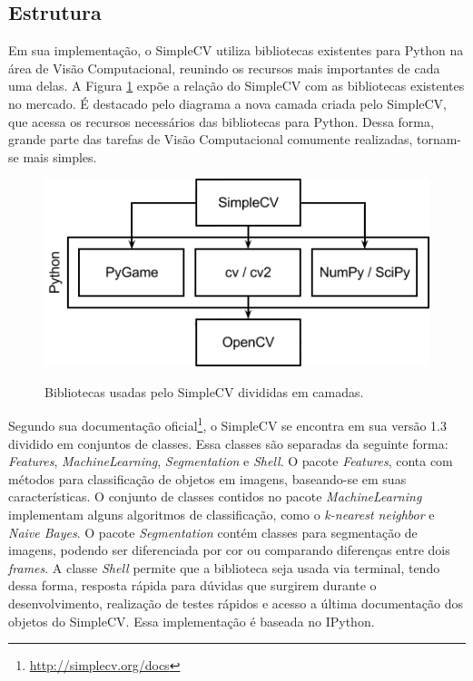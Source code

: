 \subsection{Estrutura}

Em sua implementação, o SimpleCV utiliza bibliotecas existentes para Python na área de Visão Computacional, reunindo os recursos mais importantes de cada uma delas. A Figura \ref{img:estrutura_simplecv} expõe a relação do SimpleCV com as bibliotecas existentes no mercado. É destacado pelo diagrama a nova camada criada pelo SimpleCV, que acessa os recursos necessários das bibliotecas para Python. Dessa forma, grande parte das tarefas de Visão Computacional comumente realizadas, tornam-se mais simples.

\begin{figure}[h]
    \centering
	{\includegraphics[scale=0.75]{figuras/estrutura_simplecv}}
    \caption{Bibliotecas usadas pelo SimpleCV divididas em camadas.}
    \label{img:estrutura_simplecv}
\end{figure}

Segundo sua documentação oficial\footnote{\url{http://simplecv.org/docs}}, o SimpleCV se encontra em sua versão 1.3 dividido em conjuntos de classes. Essa classes são separadas da seguinte forma: \textit{Features}, \textit{MachineLearning}, \textit{Segmentation} e \textit{Shell}. O pacote \textit{Features}, conta com métodos para classificação de objetos em imagens, baseando-se em suas características. O conjunto de classes contidos no pacote \textit{MachineLearning} implementam alguns algoritmos de classificação, como o \textit{k-nearest neighbor} e \textit{Naive Bayes}. O pacote \textit{Segmentation} contém classes para segmentação de imagens, podendo ser diferenciada por cor ou comparando diferenças entre dois \textit{frames}. A classe \textit{Shell} permite que a biblioteca seja usada via terminal, tendo dessa forma, resposta rápida para dúvidas que surgirem durante o desenvolvimento, realização de testes rápidos e acesso a última documentação dos objetos do SimpleCV. Essa implementação é baseada no IPython.

